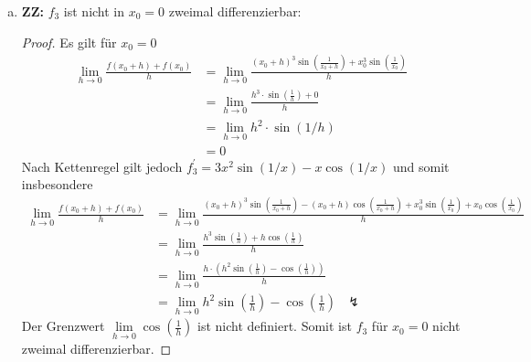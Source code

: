 \documentclass{article}
\begin{document}
\begin{enumerate}[(a)]
\begin{proof}
\begin{enumerate}[1.]
					\begin{align*}	\lim\limits_{h \rightarrow 0}\frac{f(x_0+h)+f(x_0)}{h} &= \lim\limits_{h \rightarrow 0}\frac{(x_0+h)^2\sin(\frac{1}{x_0+h})+x_{0}^{2}\sin(\frac{1}{x_0})}{h}\\ &= \lim\limits_{h \rightarrow 0}\frac{h^2\cdot\sin(\frac{1}{h})+0}{h}\\
						&= \lim\limits_{h \rightarrow 0} h\cdot\sin(1/h)\\
						&= 0			
					\end{align*}
				\item Stetigkeit: Es gilt 
				$
					f_{2}^{''}= 2x\sin(1/x)-\frac{x^2\cos(1/x)}{x^2} = 2x\sin(1/x)-\cos(1/x)  \Longrightarrow \lim\limits_{x \rightarrow 0} (2x\sin(1/x)-\cos(1/x))\text{ ist nicht definiert.}$ Somit ist $f_{2}^{'}$ insbesondere nicht stetig in $x_0=0$.
				\end{enumerate}
			\end{proof}
		\item \textbf{ZZ:} $f_3$ ist nicht in $x_0=0$ zweimal differenzierbar:
		\begin{proof} 
			Es gilt für $x_0=0$ 
			\begin{align*}	\lim\limits_{h \rightarrow 0}\frac{f(x_0+h)+f(x_0)}{h} &= \lim\limits_{h \rightarrow 0}\frac{(x_0+h)^3\sin(\frac{1}{x_0+h})+x_{0}^{3}\sin(\frac{1}{x_0})}{h}\\ &= \lim\limits_{h \rightarrow 0}\frac{h^3\cdot\sin(\frac{1}{h})+0}{h}\\
				&= \lim\limits_{h \rightarrow 0} h^2\cdot\sin(1/h)\\
				&= 0			
			\end{align*}
		Nach Kettenregel gilt jedoch 
		$f_{3}^{'} = 3x^2\sin(1/x)-x\cos(1/x)$ und somit insbesondere 
		\begin{align*}
		\lim\limits_{h \rightarrow 0}\frac{f(x_0+h)+f(x_0)}{h} &= \lim\limits_{h \rightarrow 0}\frac{(x_0+h)^3\sin(\frac{1}{x_0+h})-(x_0+h)\cos(\frac{1}{x_0+h})+x_{0}^{3}\sin(\frac{1}{x_0})+x_0\cos(\frac{1}{x_0})}{h}\\ 
		 &= \lim\limits_{h \rightarrow 0}\frac{h^3\sin(\frac{1}{h})+h\cos(\frac{1}{h})}{h}\\
		 &= \lim\limits_{h \rightarrow 0}\frac{h\cdot (h^2\sin(\frac{1}{h})-\cos(\frac{1}{h}))}{h}\\
		 &= \lim\limits_{h \rightarrow 0}h^2\sin(\frac{1}{h})-\cos(\frac{1}{h}) \text{   }
		 \lightning
		 	\end{align*}
	 	Der Grenzwert  $\lim\limits_{h \rightarrow 0}\cos(\frac{1}{h}) $ ist nicht definiert. Somit ist $f_3$ für $x_0=0$ nicht zweimal differenzierbar.
 			\end{proof}
		\end{enumerate}
\end{document}

